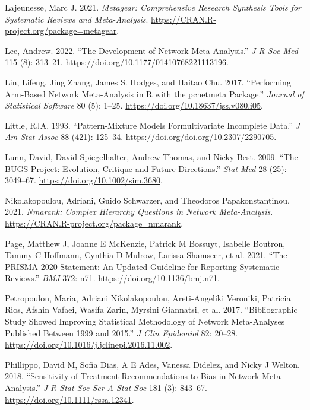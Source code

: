 \begin{CSLReferences}{1}{0}
\leavevmode{}%
Lajeunesse, Marc J. 2021. \emph{Metagear: Comprehensive Research Synthesis Tools for Systematic Reviews and Meta-Analysis}. \url{https://CRAN.R-project.org/package=metagear}.

\leavevmode{}%
Lee, Andrew. 2022. {``The Development of Network Meta-Analysis.''} \emph{J R Soc Med} 115 (8): 313--21. \url{https://doi.org/10.1177/01410768221113196}.

\leavevmode{}%
Lin, Lifeng, Jing Zhang, James S. Hodges, and Haitao Chu. 2017. {``Performing Arm-Based Network Meta-Analysis in {R} with the {pcnetmeta} Package.''} \emph{Journal of Statistical Software} 80 (5): 1--25. \url{https://doi.org/10.18637/jss.v080.i05}.

\leavevmode{}%
Little, RJA. 1993. {``Pattern-Mixture Models Formultivariate Incomplete Data.''} \emph{J Am Stat Assoc} 88 (421): 125--34. \url{https://doi.org/doi.org/10.2307/2290705}.

\leavevmode{}%
Lunn, David, David Spiegelhalter, Andrew Thomas, and Nicky Best. 2009. {``The BUGS Project: Evolution, Critique and Future Directions.''} \emph{Stat Med} 28 (25): 3049--67. \url{https://doi.org/10.1002/sim.3680}.

\leavevmode{}%
Nikolakopoulou, Adriani, Guido Schwarzer, and Theodoros Papakonstantinou. 2021. \emph{Nmarank: Complex Hierarchy Questions in Network Meta-Analysis}. \url{https://CRAN.R-project.org/package=nmarank}.

\leavevmode{}%
Page, Matthew J, Joanne E McKenzie, Patrick M Bossuyt, Isabelle Boutron, Tammy C Hoffmann, Cynthia D Mulrow, Larissa Shamseer, et al. 2021. {``The PRISMA 2020 Statement: An Updated Guideline for Reporting Systematic Reviews.''} \emph{BMJ} 372: n71. \url{https://doi.org/10.1136/bmj.n71}.

\leavevmode{}%
Petropoulou, Maria, Adriani Nikolakopoulou, Areti-Angeliki Veroniki, Patricia Rios, Afshin Vafaei, Wasifa Zarin, Myrsini Giannatsi, et al. 2017. {``Bibliographic Study Showed Improving Statistical Methodology of Network Meta-Analyses Published Between 1999 and 2015.''} \emph{J Clin Epidemiol} 82: 20--28. \url{https://doi.org/10.1016/j.jclinepi.2016.11.002}.

\leavevmode{}%
Phillippo, David M, Sofia Dias, A E Ades, Vanessa Didelez, and Nicky J Welton. 2018. {``Sensitivity of Treatment Recommendations to Bias in Network Meta-Analysis.''} \emph{J R Stat Soc Ser A Stat Soc} 181 (3): 843--67. \url{https://doi.org/10.1111/rssa.12341}.


\end{CSLReferences}
